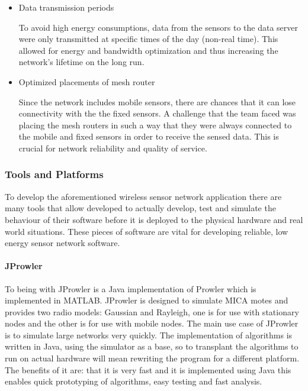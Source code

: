 \begin{itemize}
\item Data transmission periods

To avoid high energy consumptions, data from the sensors to the data server were only transmitted at specific times of the day (non-real time). This allowed for energy and bandwidth optimization and thus increasing the network's lifetime on the long run.

\item Optimized placements of mesh router 

Since the network includes mobile sensors, there are chances that it can lose connectivity with the the fixed sensors. A challenge that the team faced was placing the mesh routers in such a way that they were always connected to the mobile and fixed sensors in order to receive the sensed data. This is crucial for network reliability and quality of service.
\end{itemize}

\subsubsection{Tools and Platforms}

To develop the aforementioned wireless sensor network application there are many tools that allow developed to actually develop, test and simulate the behaviour of their software before it is deployed to the physical hardware and real world situations. These pieces of software are vital for developing reliable, low energy sensor network software.

\paragraph{JProwler} To being with JProwler \cite{JProwler} is a Java implementation of Prowler which is implemented in MATLAB. JProwler is designed to simulate MICA motes and provides two radio models: Gaussian and Rayleigh, one is for use with stationary nodes and the other is for use with mobile nodes. The main use case of JProwler is to simulate large networks very quickly. The implementation of algorithms is written in Java, using the simulator as a base, so to transplant the algorithms to run on actual hardware will mean rewriting the program for a different platform. The benefits of it are: that it is very fast and it is implemented using Java this enables quick prototyping of algorithms, easy testing and fast analysis.


